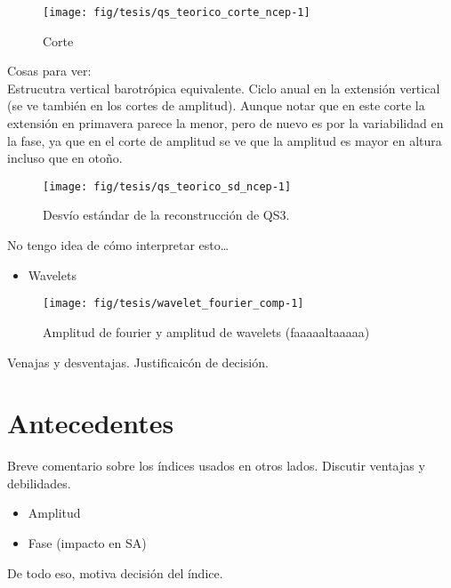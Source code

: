 \documentclass[spanish,a4paper]{book}
\providecommand{\tightlist}{%
  \setlength{\itemsep}{0pt}\setlength{\parskip}{0pt}}
\begin{document}
\begin{figure*}
\texttt{[image: fig/tesis/qs\_teorico\_corte\_ncep-1]} \caption{Corte}\label{fig:qs_teorico_corte_ncep}
\end{figure*}

Cosas para ver:\\
Estrucutra vertical barotrópica equivalente. Ciclo anual en la extensión
vertical (se ve también en los cortes de amplitud). Aunque notar que en
este corte la extensión en primavera parece la menor, pero de nuevo es
por la variabilidad en la fase, ya que en el corte de amplitud se ve que
la amplitud es mayor en altura incluso que en otoño.

\begin{figure*}
\texttt{[image: fig/tesis/qs\_teorico\_sd\_ncep-1]} \caption{Desvío estándar de la reconstrucción de QS3.}\label{fig:qs_teorico_sd_ncep}
\end{figure*}

No tengo idea de cómo interpretar esto\ldots{}

\begin{itemize}
\tightlist
\item
  Wavelets
\end{itemize}

\begin{figure}

{\centering \texttt{[image: fig/tesis/wavelet\_fourier\_comp-1]} 

}

\caption{Amplitud de fourier y amplitud de wavelets (faaaaaltaaaaa)}\label{fig:wavelet_fourier_comp}
\end{figure}

Venajas y desventajas. Justificaicón de decisión.

\section{Antecedentes}\label{antecedentes}

Breve comentario sobre los índices usados en otros lados. Discutir
ventajas y debilidades.

\begin{itemize}
\tightlist
\item
  Amplitud
\item
  Fase (impacto en SA)
\end{itemize}

De todo eso, motiva decisión del índice.
\end{document}
